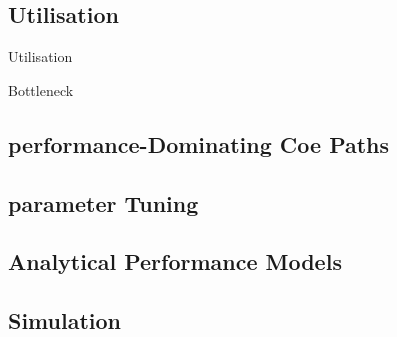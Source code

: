 \subsection{Utilisation}
\begin{definitionbox}{Utilisation}
\end{definitionbox}
\begin{definitionbox}{Bottleneck}
\end{definitionbox}

\subsection{performance-Dominating Coe Paths}


\subsection{parameter Tuning}

\subsection{Analytical Performance Models}

\subsection{Simulation}

